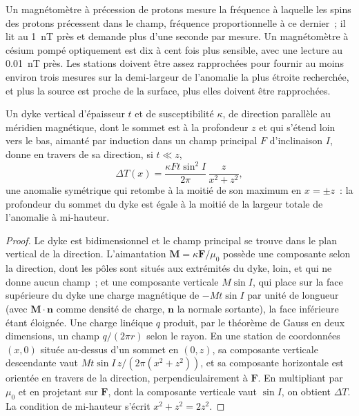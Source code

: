 Un magnétomètre à précession de protons mesure la fréquence à laquelle les
spins des protons précessent dans le champ, fréquence proportionnelle à ce
dernier~; il lit au \qty{1}{nT} près et demande plus d'une seconde par mesure.
Un magnétomètre à césium pompé optiquement est dix à cent fois plus sensible,
avec une lecture au \qty{0.01}{nT} près. Les stations doivent être assez
rapprochées pour fournir au moins environ trois mesures sur la demi-largeur de
l'anomalie la plus étroite recherchée, et plus la source est proche de la
surface, plus elles doivent être rapprochées.

\begin{proposition}\label{prop:b3:field-lab-methods-3:dyke}
Un dyke vertical d'épaisseur $t$ et de susceptibilité $\kappa$, de direction
parallèle au méridien magnétique, dont le sommet est à la profondeur $z$ et
qui s'étend loin vers le bas, aimanté par induction dans un champ principal $F$ d'inclinaison $I$,
donne en travers de sa direction, si $t \ll z$,
\[
\Delta T(x) = \frac{\kappa F t\sin^2 I}{2\pi}\,\frac{z}{x^2 + z^2} ,
\]
une anomalie symétrique qui retombe à la moitié de son maximum en $x = \pm z$~: la
profondeur du sommet du dyke est égale à la moitié de la largeur totale de
l'anomalie à mi-hauteur.
\end{proposition}

\begin{proof}
Le dyke est bidimensionnel et le champ principal se trouve dans le plan
vertical de la direction. L'aimantation $\mathbf{M} = \kappa\mathbf{F}/\mu_0$
possède une composante selon la direction, dont les pôles sont situés aux
extrémités du dyke, loin, et qui ne donne aucun champ~; et une composante verticale $M
\sin I$, qui place sur la face supérieure du dyke une charge
magnétique de $-Mt\sin I$ par unité de longueur (avec $\mathbf{M}\cdot\mathbf{n}$
comme densité de charge, $\mathbf{n}$ la normale sortante), la face inférieure
étant éloignée. Une charge linéique $q$ produit, par le théorème de Gauss en
deux dimensions, un champ $q/(2\pi r)$ selon le rayon. En une station de
coordonnées $(x, 0)$ située au-dessus d'un sommet en $(0, z)$, sa composante
verticale descendante vaut $Mt\sin I\,z/(2\pi(x^2 + z^2))$, et sa composante horizontale
est orientée en travers de la direction, perpendiculairement à $\mathbf{F}$.
En multipliant par $\mu_0$ et en projetant sur $\mathbf{F}$, dont la composante
verticale vaut $\sin I$, on obtient $\Delta T$. La condition de mi-hauteur s'écrit $x^2 + z^2 =
2z^2$.
\end{proof}


